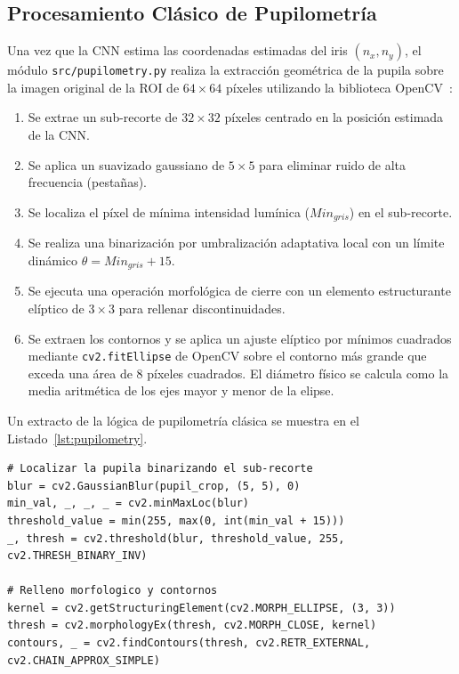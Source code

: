 \documentclass[twocolumn,10pt,letterpaper]{article}
\begin{document}
\subsection{Procesamiento Clásico de Pupilometría}
Una vez que la CNN estima las coordenadas estimadas del iris $(n_x, n_y)$, el módulo \texttt{src/pupilometry.py} realiza la extracción geométrica de la pupila sobre la imagen original de la ROI de $64\times64$ píxeles utilizando la biblioteca OpenCV~\cite{opencv, bradski2008}:
\begin{enumerate}
    \item Se extrae un sub-recorte de $32\times32$ píxeles centrado en la posición estimada de la CNN.
    \item Se aplica un suavizado gaussiano de $5\times5$ para eliminar ruido de alta frecuencia (pestañas).
    \item Se localiza el píxel de mínima intensidad lumínica ($Min_{gris}$) en el sub-recorte.
    \item Se realiza una binarización por umbralización adaptativa local con un límite dinámico $\theta = Min_{gris} + 15$.
    \item Se ejecuta una operación morfológica de cierre con un elemento estructurante elíptico de $3\times3$ para rellenar discontinuidades.
    \item Se extraen los contornos y se aplica un ajuste elíptico por mínimos cuadrados mediante \texttt{cv2.fitEllipse} de OpenCV sobre el contorno más grande que exceda una área de 8 píxeles cuadrados. El diámetro físico se calcula como la media aritmética de los ejes mayor y menor de la elipse.
\end{enumerate}

Un extracto de la lógica de pupilometría clásica se muestra en el Listado~\ref{lst:pupilometry}.

\begin{lstlisting}[label=lst:pupilometry, caption=Algoritmo de binarización de pupila clásica en OpenCV.]
# Localizar la pupila binarizando el sub-recorte
blur = cv2.GaussianBlur(pupil_crop, (5, 5), 0)
min_val, _, _, _ = cv2.minMaxLoc(blur)
threshold_value = min(255, max(0, int(min_val + 15)))
_, thresh = cv2.threshold(blur, threshold_value, 255, cv2.THRESH_BINARY_INV)

# Relleno morfologico y contornos
kernel = cv2.getStructuringElement(cv2.MORPH_ELLIPSE, (3, 3))
thresh = cv2.morphologyEx(thresh, cv2.MORPH_CLOSE, kernel)
contours, _ = cv2.findContours(thresh, cv2.RETR_EXTERNAL, cv2.CHAIN_APPROX_SIMPLE)
\end{lstlisting}
\end{document}

